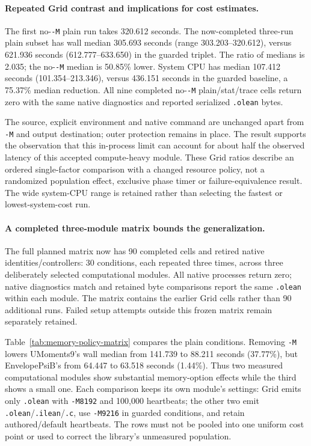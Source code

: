 \documentclass[10pt,twocolumn]{article}
\begin{document}
\paragraph{Repeated Grid contrast and implications for cost estimates.}
The first no-\texttt{-M} plain run takes 320.612 seconds.
The now-completed three-run plain subset has wall median 305.693 seconds
(range 303.203--320.612), versus 621.936 seconds
(612.777--633.650) in the guarded triplet.
The ratio of medians is 2.035; the no-\texttt{-M} median is 50.85\% lower.
System CPU has median 107.412 seconds (101.354--213.346), versus
436.151 seconds in the guarded baseline, a 75.37\% median reduction.
All nine completed no-\texttt{-M} plain/stat/trace cells return zero with
the same native diagnostics and reported serialized \texttt{.olean} bytes.

The source, explicit environment and native command are unchanged apart
from \texttt{-M} and output destination; outer protection remains in place.
The result supports the observation that this in-process limit can account
for about half the observed latency of this accepted compute-heavy module.
These Grid ratios describe an ordered single-factor comparison with a
changed resource policy, not a randomized population effect, exclusive
phase timer or failure-equivalence result.
The wide system-CPU range is retained rather than selecting the fastest
or lowest-system-cost run.
\paragraph{A completed three-module matrix bounds the generalization.}
The full planned matrix now has 90 completed cells and retired native
identities/controllers: 30 conditions, each repeated three times, across
three deliberately selected computational modules.
All native processes return zero; native diagnostics match and retained
byte comparisons report the same \texttt{.olean} within each module.
The matrix contains the earlier Grid cells rather than 90 additional runs.
Failed setup attempts outside this frozen matrix remain separately retained.

Table~\ref{tab:memory-policy-matrix} compares the plain conditions.
Removing \texttt{-M} lowers UMoments9's wall median from 141.739 to
88.211 seconds (37.77\%), but EnvelopePsiB's from 64.447 to 63.518
seconds (1.44\%). Thus two measured computational modules show substantial
memory-option effects while the third shows a small one.
Each comparison keeps its own module's settings: Grid emits only
\texttt{.olean} with \texttt{-M8192} and 100,000 heartbeats;
the other two emit \texttt{.olean}/\texttt{.ilean}/\texttt{.c}, use
\texttt{-M9216} in guarded conditions, and retain authored/default heartbeats.
The rows must not be pooled into one uniform cost point or used to correct
the library's unmeasured population.
\end{document}
